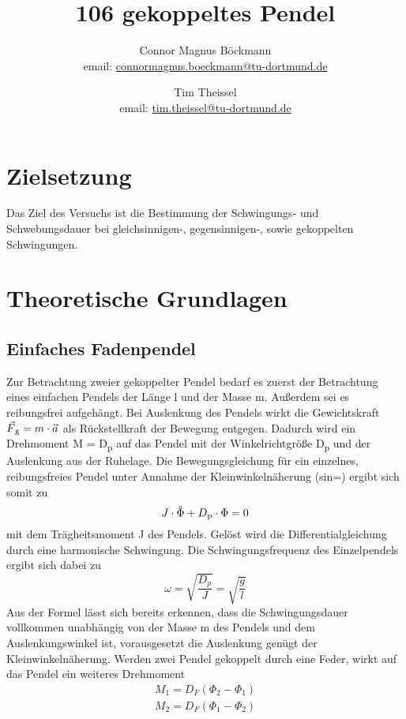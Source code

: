 \documentclass[titlepage=firstcover, captions=tableheading]{scrartcl}
\title{106 gekoppeltes Pendel}
\author{
Connor Magnus Böckmann \\ email: \href{mailto:connormagnus.boeckmann@tu-dortmund.de}{connormagnus.boeckmann@tu-dortmund.de}
\and Tim Theissel \\ email: \href{mailto:tim.theissel@tu-dortmund.de}{tim.theissel@tu-dortmund.de}  
}
\begin{document}
\maketitle
\newpage
\tableofcontents
\newpage
\section{Zielsetzung}
Das Ziel des Versuchs ist die Bestimmung der Schwingungs- und Schwebungsdauer bei gleichsinnigen-, gegensinnigen-, sowie gekoppelten Schwingungen.
\section{Theoretische Grundlagen}
\subsection{Einfaches Fadenpendel}
Zur Betrachtung zweier gekoppelter Pendel bedarf es zuerst der Betrachtung eines einfachen Pendels der Länge l und der Masse m. 
Außerdem sei es reibungsfrei aufgehängt. 
Bei Auslenkung des Pendels wirkt die Gewichtskraft $\vec{F}\textsubscript{g} = m\cdot\vec{a}$ als Rückstellkraft der Bewegung entgegen. 
Dadurch wird ein Drehmoment M = D\textsubscript{p}\cdot\Phi \; auf das Pendel mit der Winkelrichtgröße D\textsubscript{p} und der Auslenkung \Phi \;  aus der Ruhelage. 
Die Bewegungsgleichung für ein einzelnes, reibungsfreies Pendel unter Annahme der Kleinwinkelnäherung (sin\theta=\theta) ergibt sich somit zu 
\begin{equation}
    J\cdot\ddot{\Phi}+D\textsubscript{p}\cdot\Phi=0 \label{(1)}
\end{equation}
mit dem Trägheitsmoment J des Pendels. Gelöst wird die Differentialgleichung durch eine harmonische Schwingung. Die Schwingungsfrequenz des Einzelpendels ergibt sich dabei zu  
\begin{displaymath}
    \omega=\sqrt{\frac{D_p}{J}}=\sqrt{\frac{g}{l}}
\end{displaymath}
Aus der Formel lässt sich bereits erkennen, dass die Schwingungsdauer vollkommen unabhängig von der Masse m des Pendels und dem Auslenkungswinkel \Phi \; ist, vorausgesetzt die Auslenkung genügt der Kleinwinkelnäherung.
Werden zwei Pendel gekoppelt durch eine Feder, wirkt auf das Pendel ein weiteres Drehmoment
\begin{align}
    M_1=D_F(\Phi_2-\Phi_1) \label{(2)}\\
    M_2=D_F(\Phi_1-\Phi_2) \label{(3)}
\end{align}
\end{document}
